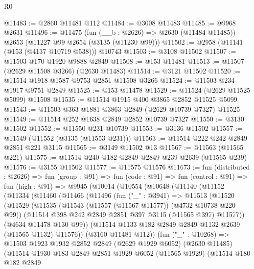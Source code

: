 \begin{lexlean}{R0}
\begin{coremodule}
@11483 := @2860 @11481 @112
@11484 := @3008 @11483
@11485 := @9968 @2631
@11496 := @11475
    (fun (__b : @2626) => @2630 (@11484 @11485))
    @2653
    (@11227 @99 @2654 (@3135 (@11230 @99)))
@11502 := @2958 (@11141 (@153 (@4137 @10719 @538))) @10743
@11503 := @3108 @11502
@11507 := @11503 @170 @1920 @9888 @2849
@11508 := @153 @11481
@11513 := @11507 (@2629 @11508 @3266) (@2630 @11483)
@11514 := @3121 @11502
@11520 := @11514 @1918 @1587 @9753 @2851 @11508 @3266
@11524 := @11503 @234 @1917 @9751 @2849
@11525 := @153 @11478
@11529 := @11524 (@2629 @11525 @5099) @11508
@11535 := @11514 @1915 @400 @3865 @2852 @11525 @5099
@11543 := @11503 @363 @1881 @3863 @2849 (@2629 @10739 @7327) @11525
@11549 := @11514 @252 @1638 @2849 @2852 @10739 @7327
@11550 := @3130 @11502
@11552 := @11550 @231 @10739
@11553 := @3136 @11502
@11557 := @11549 (@11552 (@3135 (@11553 @231)))
@11563 := @11514 @222 @242 @2849 @2851 @221 @3115
@11565 := @3149 @11502 @13
@11567 := @11563 (@11565 @221)
@11575 := @11514 @240 @182 @2849 @2849 @239 @2639 (@11565 @239)
@11576 := @3155 @11502
@11577 := @11575 @11576
@11673 := fun (distributed : @2626) =>
  fun (group : @91) =>
  fun (code : @91) =>
  fun (control : @91) =>
  fun (high : @91) =>
  @9945
    (@10014
      (@10554
        (@10648
          (@11140
            (@11152
              (@11334
                (@11460
                  (@11466
                    (@11496
                      (fun ("_" : @3941) =>
                      @11513
                        (@11520
                          (@11529
                            (@11535
                              (@11543 (@11557 (@11567 @11577)) (@4732 @10738 @220 @99))
                              (@11514 @398 @242 @2849 @2851 @397 @3115 (@11565 @397) @11577))
                            (@4634 @11478 @130 @99))
                          (@11514 @1133 @182 @2849 @2849 @1132 @2639 (@11565 @1132) @11576))
                        (@3160 @11481 @112))
                      (fun ("_" : @10268) =>
                      @11503
                        @1923
                        @1932
                        @2852
                        @2849
                        (@2629 @1929 @6052)
                        (@2630 @11485)
                        (@11514
                          @1930
                          @183
                          @2849
                          @2851
                          @1929
                          @6052
                          (@11565 @1929)
                          (@11514
                            @180
                            @182
                            @2849

\end{coremodule}
\end{lexlean}

